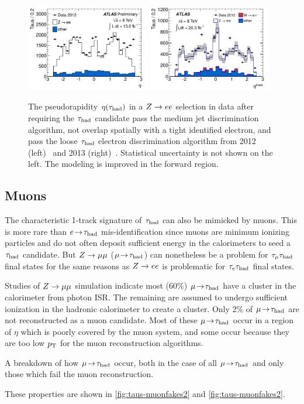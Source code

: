 \begin{figure}[tp]
  \centering
  \includegraphics[width=0.48\textwidth]{figures/ATLAS-CONF-2013-064/fig_22b}
  \includegraphics[width=0.48\textwidth]{figures/PERF-2013-06/fig_14b}
  \caption{The pseudorapidity $\eta(\tauh)$ in a $Z \rightarrow ee$ selection in data after requiring the $\tau_\text{had}$ candidate pass the medium jet discrimination algorithm, not overlap spatially with a tight identified electron, and pass the loose $\tau_\text{had}$ electron discrimination algorithm from 2012 (left)~\cite{ATLAS-CONF-2013-064} and 2013 (right)~\cite{PERF-2013-06}. Statistical uncertainty is not shown on the left. The modeling is improved in the forward region.}
  \label{fig:taus-electronfakes3}
\end{figure}

\subsection{Muons}

The characteristic 1-track signature of $\tau_\text{had}$ can also be mimicked by muons. This is more rare than $e \!\rightarrow\!\tau_\text{had}$ mis-identification since muons are minimum ionizing particles and do not often deposit sufficient energy in the calorimeters to seed a $\tau_\text{had}$ candidate. But $Z \rightarrow \mu\mu$ ($\mu\!\rightarrow\!\tau_\text{had}$) can nonetheless be a problem for $\tau_\mu \tau_\text{had}$ final states for the same reasons as $Z \rightarrow ee$ is problematic for $\tau_e \tau_\text{had}$ final states.

Studies of $Z \rightarrow \mu\mu$ simulation indicate most (60\%) $\mu\!\rightarrow\!\tau_\text{had}$ have a cluster in the calorimeter from photon ISR. The remaining are assumed to undergo sufficient ionization in the hadronic calorimeter to create a cluster. Only 2\% of $\mu\!\rightarrow\!\tau_\text{had}$ are not reconstructed as a muon candidate. Most of these $\mu\!\rightarrow\!\tau_\text{had}$ occur in a region of $\eta$ which is poorly covered by the muon system, and some occur because they are too low $p_{\mathrm{T}}$ for the muon reconstruction algorithms.
%
\begin{table}[htp] 
  \centering
  \renewcommand{\arraystretch}{1.4}
  \caption{A breakdown of how $\mu\!\rightarrow\!\tau_\text{had}$ occur, both in the case of all $\mu\!\rightarrow\!\tau_\text{had}$ and only those which fail the muon reconstruction.}
  
  \label{tab:taus-muonfakes}
\end{table}
%
These properties are shown in \cref{fig:taus-muonfakes2} and \cref{fig:taus-muonfakes2}.

